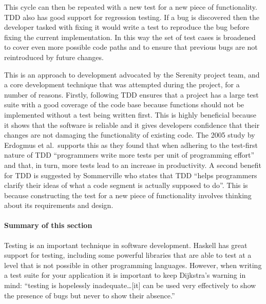 This cycle can then be repeated with a new test for a new piece of functionality.
TDD also has good support for regression testing. If a bug is discovered then the developer
tasked with fixing it would write a test to reproduce the bug before fixing the current
implementation. In this way the set of test cases is broadened to cover even more
possible code paths and to ensure that previous bugs are not reintroduced by future
changes.

This is an approach to development advocated by the Serenity project team, and a core
development technique that was attempted during the project,
for a number of reasons. Firstly, following TDD ensures that a project has a large
test suite with a good coverage of the code base because functions should not be
implemented without a test being written first. This is highly beneficial because
it shows that the software is reliable and it gives developers confidence that their
changes are not damaging the functionality of existing code. The 2005 study by
Erdogmus et al.\ supports this as they found that when adhering to the test-first
nature of TDD ``programmers write more tests per unit of programming effort'' and
that, in turn, more tests lead to an increase in productivity.\cite{erdogmus2005}
A second benefit for TDD is suggested by Sommerville who states that TDD ``helps
programmers clarify their ideas of what a code segment is actually supposed to
do''. This is because constructing the test for
a new piece of functionality involves thinking about its requirements and design.



\paragraph{Summary of this section} Testing is an important technique in software
development. Haskell has great support for testing, including some powerful libraries
that are able to test at a level that is not possible in other programming languages.
However, when writing a test suite for your application it is important to keep
Dijkstra's warning in mind: ``testing is hopelessly inadequate\ldots [it] can be used
very effectively to show the presence of bugs but never to show their absence.''\cite{EWD303}
